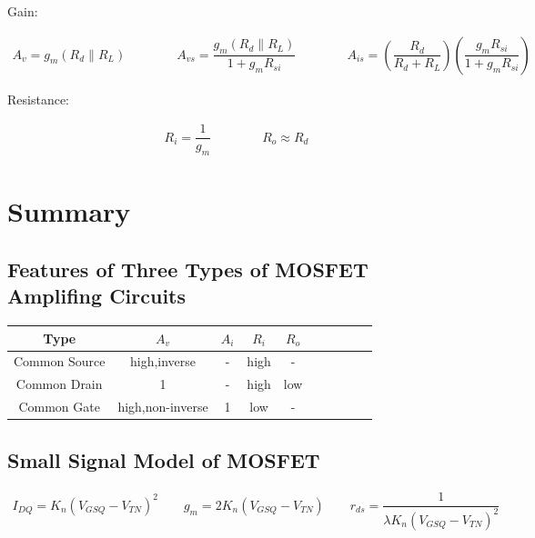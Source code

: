 Gain:

\begin{equation*}
  \begin{aligned}
    A_v = g_m \left( R_d \parallel R_L  \right) \quad\quad \quad\quad 
    A_{vs} = \dfrac{g_m \left( R_d \parallel R_L \right)}{1 + g_m R_{si}}  \quad\quad \quad\quad 
    A_{is} = \left( \dfrac{R_d}{R_d + R_L}  \right) \left( \dfrac{g_m R_{si}}{1 + g_m R_{si}}  \right)
  \end{aligned}
\end{equation*}

Resistance:

\begin{equation*}
  \begin{aligned}
    R_i = \dfrac{1}{g_m} \quad\quad \quad\quad 
    R_o \approx R_d
  \end{aligned}
\end{equation*}

\section{Summary}

\subsection{Features of Three Types of MOSFET Amplifing Circuits}

\begin{table}[htbp]
  \centering
  \begin{tabular}{|Sc|Sc|Sc|Sc|Sc|}
    \hline
    Type & $A_v$ & $A_i$ & $R_i$ & $R_o$ \\
    \hline
    Common Source & high,inverse & - & high & - \\
    \hline
    Common Drain & 1 & - & high & low \\
    \hline
    Common Gate & high,non-inverse & 1 & low & - \\
    \hline
  \end{tabular}
\end{table}

\subsection{Small Signal Model of MOSFET}

\begin{equation*}
  \begin{aligned}
    I_{DQ} = K_n \left( V_{GSQ} - V_{TN} \right)^2 \quad\quad
    g_m = 2 K_n \left( V_{GSQ} - V_{TN} \right) \quad\quad
    r_{ds} = \dfrac{1}{\lambda K_n \left( V_{GSQ} - V_{TN} \right)^2} 
  \end{aligned}
\end{equation*}

